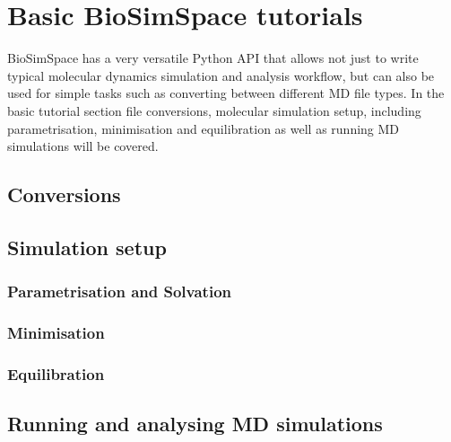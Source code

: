 \documentclass[9pt,tutorial]{livecoms}
\begin{document}
\section{Basic BioSimSpace tutorials}
\label{sec:basic_tutorial}
BioSimSpace has a very versatile Python API that allows not just to write typical molecular dynamics simulation and analysis workflow, but can also be used for simple tasks such as converting between different MD file types. In the basic tutorial section file conversions, molecular simulation setup, including parametrisation, minimisation and equilibration as well as running MD simulations will be covered. 

\subsection{Conversions}
\label{subsec:conversion}

\subsection{Simulation setup}
\label{subsec:setup}

\subsubsection{Parametrisation and Solvation}

\subsubsection{Minimisation}

\subsubsection{Equilibration}


\subsection{Running and analysing MD simulations}
\label{subsec:running_MD}

\end{document}
